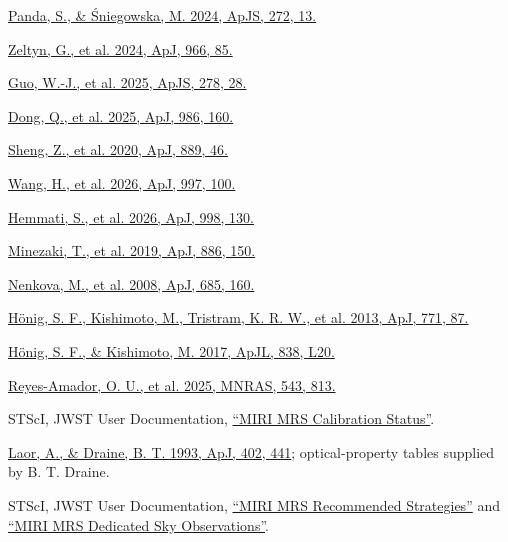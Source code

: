 \documentclass[12pt]{article}
\begin{document}
\noindent [32] \href{https://arxiv.org/abs/2206.10056}{Panda, S., \& \'Sniegowska, M. 2024, ApJS, 272, 13.}\par
\noindent [33] \href{https://arxiv.org/abs/2401.01933}{Zeltyn, G., et al. 2024, ApJ, 966, 85.}\par
\noindent [34] \href{https://arxiv.org/abs/2408.00402}{Guo, W.-J., et al. 2025, ApJS, 278, 28.}\par
\noindent [35] \href{https://arxiv.org/abs/2408.07335}{Dong, Q., et al. 2025, ApJ, 986, 160.}\par
\noindent [36] \href{https://doi.org/10.3847/1538-4357/ab5af9}{Sheng, Z., et al. 2020, ApJ, 889, 46.}\par
\noindent [37] \href{https://doi.org/10.3847/1538-4357/ae1fdc}{Wang, H., et al. 2026, ApJ, 997, 100.}\par
\noindent [38] \href{https://doi.org/10.3847/1538-4357/ae38b8}{Hemmati, S., et al. 2026, ApJ, 998, 130.}\par
\noindent [39] \href{https://doi.org/10.3847/1538-4357/ab4f7b}{Minezaki, T., et al. 2019, ApJ, 886, 150.}\par
\noindent [40] \href{https://arxiv.org/abs/0806.0512}{Nenkova, M., et al. 2008, ApJ, 685, 160.}\par
\noindent [41] \href{https://arxiv.org/abs/1306.4312}{H\"onig, S. F., Kishimoto, M., Tristram, K. R. W., et al. 2013, ApJ, 771, 87.}\par
\noindent [42] \href{https://doi.org/10.3847/2041-8213/aa6838}{H\"onig, S. F., \& Kishimoto, M. 2017, ApJL, 838, L20.}\par
\noindent [43] \href{https://doi.org/10.1093/mnras/staf1494}{Reyes-Amador, O. U., et al. 2025, MNRAS, 543, 813.}\par
\noindent [44] STScI, JWST User Documentation, \href{https://jwst-docs.stsci.edu/jwst-calibration-status/miri-calibration-status/miri-mrs-calibration-status}{``MIRI MRS Calibration Status''}.\par
\noindent [45] \href{https://doi.org/10.1086/172149}{Laor, A., \& Draine, B. T. 1993, ApJ, 402, 441}; optical-property tables supplied by B. T. Draine.\par
\noindent [46] STScI, JWST User Documentation, \href{https://jwst-docs.stsci.edu/jwst-mid-infrared-instrument/miri-observing-strategies/miri-mrs-recommended-strategies}{``MIRI MRS Recommended Strategies''} and \href{https://jwst-docs.stsci.edu/jwst-mid-infrared-instrument/miri-operations/miri-dithering/miri-mrs-dedicated-sky-observations}{``MIRI MRS Dedicated Sky Observations''}.\par
\end{document}
